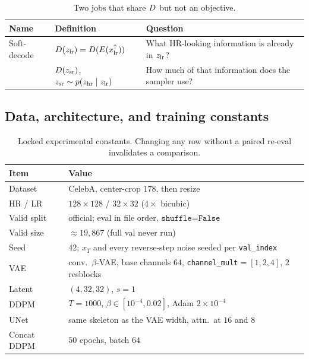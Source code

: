 \begin{table}[htbp]
  \centering
  \caption{Two jobs that share $D$ but not an objective.}
  \label{tab:two-jobs}
  \small
  \setlength{\tabcolsep}{3pt}
  \begin{tabularx}{\columnwidth}{@{}
      >{\raggedright\arraybackslash}p{1.55cm}
      >{\raggedright\arraybackslash}X
      >{\raggedright\arraybackslash}X@{}}
    \toprule
    Name & Definition & Question \\
    \midrule
    Soft-decode &
      $D(z_{\mathrm{lr}})=D(E(x_{\mathrm{lr}}^{\uparrow}))$ &
      What HR-looking information is already in $z_{\mathrm{lr}}$? \\
    \lsrmethod{} &
      $D(z_{\mathrm{sr}})$, $z_{\mathrm{sr}}\sim p(z_{\mathrm{hr}}\mid z_{\mathrm{lr}})$ &
      How much of that information does the sampler use? \\
    \bottomrule
  \end{tabularx}
\end{table}

\subsection{Data, architecture, and training constants}
\label{sec:data}

\begin{table}[htbp]
  \centering
  \caption{Locked experimental constants. Changing any row without
  a paired re-eval invalidates a comparison.}
  \label{tab:constants}
  \small
  \setlength{\tabcolsep}{4pt}
  \begin{tabularx}{\columnwidth}{@{}lX@{}}
    \toprule
    Item & Value \\
    \midrule
    Dataset & CelebA, center-crop $178$, then resize \\
    HR / LR & $128\times 128$ / $32\times 32$ ($4\times$ bicubic) \\
    Valid split & official; eval in file order, $\texttt{shuffle=False}$ \\
    Valid size & $\approx 19{,}867$ (full val never run) \\
    Seed & $42$; $x_T$ and every reverse-step noise seeded per \texttt{val\_index} \\
    VAE & conv.\ $\beta$-VAE, base channels $64$, \texttt{channel\_mult}$=[1,2,4]$, $2$ resblocks \\
    Latent & $(4,32,32)$, $s{=}1$ \\
    DDPM & $T{=}1000$, $\beta\in[10^{-4},0.02]$, Adam $2{\times}10^{-4}$ \\
    UNet & same skeleton as the VAE width, attn.\ at $16$ and $8$ \\
    Concat DDPM & $50$ epochs, batch $64$ \\
    \bottomrule
  \end{tabularx}
\end{table}

